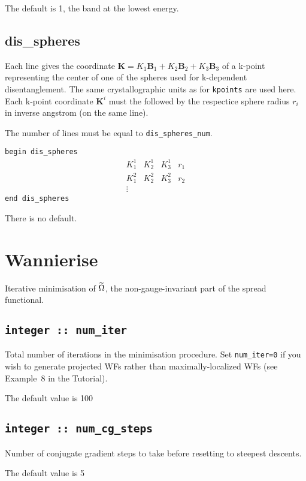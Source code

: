 The default is 1, the band at the lowest energy.


\subsection[dis\_spheres]{dis\_spheres}
Each line gives the coordinate $\mathbf{K}=K_1 \mathbf{B}_{1} + K_2
\mathbf{B}_{2} + K_3 \mathbf{B}_3$ of a k-point representing the
center of one of the spheres used for k-dependent disentanglement.
The same crystallographic units as for {\tt kpoints} are used here.
Each k-point coordinate $\mathbf{K}^i$ must the followed by the 
respectice sphere radius $r_{i}$ in inverse angstrom (on the same line).

The number of lines must be equal to {\tt dis\_spheres\_num}.

\noindent  \verb#begin dis_spheres#
$$
\begin{array}{cccc}
 K^{1}_{1} & K^{1}_{2} & K^{1}_{3} & r_{1} \\
 K^{2}_{1} & K^{2}_{2} & K^{2}_{3} & r_{2} \\
\vdots
\end{array}
$$
\verb#end dis_spheres#

There is no default.


\section{Wannierise}\label{sec:wann_params}
Iterative minimisation of $\widetilde{\Omega}$, the non-gauge-invariant part of the
spread functional.

\subsection[num\_iter]{\tt integer :: num\_iter}

Total number of iterations in the minimisation procedure.
Set {\tt num\_iter=0} if you wish to generate
  projected WFs rather than maximally-localized WFs (see Example~8 in
  the Tutorial).

The default value is 100

\subsection[num\_cg\_steps]{\tt integer :: num\_cg\_steps}

Number of conjugate gradient steps to take before resetting to steepest descents.

The default value is 5

